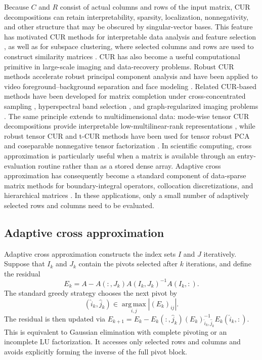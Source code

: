 \documentclass[11pt, preprint]{article}
\begin{document}
Because $C$ and $R$ consist of actual columns and rows of the input matrix,
CUR decompositions can retain interpretability, sparsity, localization,
nonnegativity, and other structure that may be obscured by singular-vector
bases. This feature has motivated CUR methods for interpretable data analysis
and feature selection
\cite{Drineas_RelativeErrorCUR2008,Mahoney_CURData2009}, as well as for
subspace clustering, where selected columns and rows are used to construct
similarity matrices
\cite{Aldroubi_CURSubspace2019}. 
CUR has also become a useful computational primitive in large-scale imaging
and data-recovery problems. Robust CUR methods accelerate robust principal
component analysis and have been applied to video foreground--background
separation and face modeling
\cite{Cai_RapidRobustPCA2021,Cai_RobustCUR2021}. Related CUR-based methods
have been developed for matrix completion under cross-concentrated sampling
\cite{Cai_CrossConcentratedSampling2023}, hyperspectral band selection
\cite{Henneberger_HyperspectralCUR2023}, and graph-regularized imaging
problems \cite{Huang_DualGraphCUR2023}. The same principle extends to
multidimensional data: mode-wise tensor CUR decompositions provide
interpretable low-multilinear-rank representations
\cite{Cai_ModeWiseTensorCUR2021}, while robust tensor CUR and t-CUR methods
have been used for tensor robust PCA and coseparable nonnegative tensor
factorization
\cite{Cai_RobustTensorCUR2024,Chen_CoseparableTensorCUR2024}. 
In scientific computing, cross approximation is particularly useful when a
matrix is available through an entry-evaluation routine rather than as a
stored dense array. Adaptive cross approximation has consequently become a
standard component of data-sparse matrix methods for boundary-integral
operators, collocation discretizations, and hierarchical matrices
\cite{Bebendorf_ApproximationBoundaryElement2000,
Bebendorf_AdaptiveLowRankApproximation2003,
Bebendorf_AcceleratingGalerkinBEM2006}. In these applications, only a small
number of adaptively selected rows and columns need to be evaluated.

\subsection{Adaptive cross approximation}

Adaptive cross approximation constructs the index sets $I$ and $J$
iteratively. Suppose that $I_k$ and $J_k$ contain the pivots selected after
$k$ iterations, and define the residual
\[
    E_k
    =
    A-A(:,J_k)A(I_k,J_k)^{-1}A(I_k,:).
\]
The standard greedy strategy chooses the next pivot by \[  (\widehat{i}_k,\widehat{j}_k)  \in \operatorname*{arg\,max}_{i,j}|(E_k)_{ij}|.\]
The residual is then  updated via \(E_{k+1}  = E_k - E_k(:,\widehat{j}_k) (E_k)_{\widehat{i}_k,\widehat{j}_k}^{-1}E_k(\widehat{i}_k,:).\)
This is equivalent to Gaussian elimination with complete pivoting or an incomplete LU factorization. It accesses only selected rows and columns and avoids explicitly forming the inverse of the full pivot block.
\end{document}
